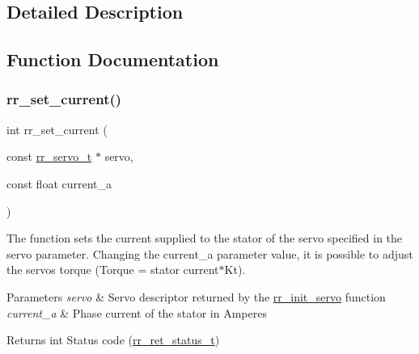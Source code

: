 \subsection{Detailed Description}


\subsection{Function Documentation}
\mbox{\label{group___motion_gac25d20b331b1b985c1f6f50106d5c971}} 
\subsubsection{\texorpdfstring{rr\+\_\+set\+\_\+current()}{rr\_set\_current()}}
{\footnotesize\ttfamily int rr\+\_\+set\+\_\+current (\begin{DoxyParamCaption}\item[{const \hyperlink{structrr__servo__t}{rr\+\_\+servo\+\_\+t} $\ast$}]{servo,  }\item[{const float}]{current\+\_\+a }\end{DoxyParamCaption})}



The function sets the current supplied to the stator of the servo specified in the \textquotesingle{}servo\textquotesingle{} parameter. Changing the \textquotesingle{}current\+\_\+a parameter\textquotesingle{} value, it is possible to adjust the servo\textquotesingle{}s torque (Torque = stator current$\ast$\+Kt). 


\begin{DoxyParams}{Parameters}
{\em servo} & Servo descriptor returned by the \hyperlink{group___init_ga0adb313a3eeb8a4399431e940a1f3e9e}{rr\+\_\+init\+\_\+servo} function \\
\hline
{\em current\+\_\+a} & Phase current of the stator in Amperes \\
\hline
\end{DoxyParams}
\begin{DoxyReturn}{Returns}
int Status code (\hyperlink{api_8h_a92d5be5038abcf89837faf85a08debdc}{rr\+\_\+ret\+\_\+status\+\_\+t}) 
\end{DoxyReturn}
\mbox{\label{group___motion_ga67890b1af333ce15f291a24ddc5760d1}} 
